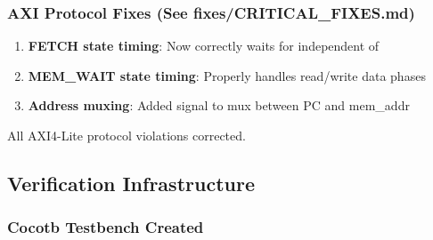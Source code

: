 \subsubsection{\texorpdfstring{AXI Protocol Fixes (See
fixes/\allowbreak{}CRITICAL\_\allowbreak{}FIXES.md)}{AXI Protocol Fixes (See \cref{cr:fix:critical-fixes})}}\label{cr:fix:cpu-verification-ready:axi-protocol-fixes-see-fixescritical-fixesmd}

\begin{record}

\begin{enumerate}
\def\labelenumi{\arabic{enumi}.}
\tightlist
\item
  \textbf{FETCH state timing}: Now correctly waits for 
  independent of 
\item
  \textbf{MEM\_WAIT state timing}: Properly handles
  read/\allowbreak{}write data phases
\item
  \textbf{Address muxing}: Added  signal to mux
   between PC and mem\_addr
\end{enumerate}

All AXI4-Lite protocol violations corrected.

\end{record}

\subsection{\texorpdfstring{Verification Infrastructure
\ok{}}{Verification Infrastructure }}\label{cr:fix:cpu-verification-ready:verification-infrastructure-white-check-mark}

\subsubsection{Cocotb Testbench Created}\label{cr:fix:cpu-verification-ready:cocotb-testbench-created}

